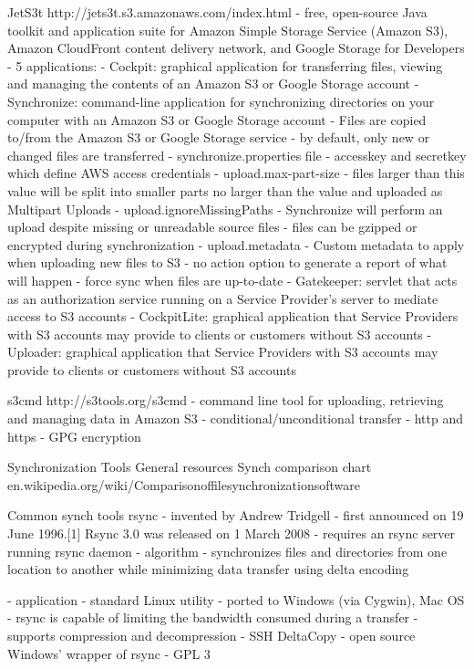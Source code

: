 			JetS3t
				http://jets3t.s3.amazonaws.com/index.html
				- free, open-source Java toolkit and application suite for Amazon Simple Storage Service (Amazon S3), Amazon CloudFront content delivery network, and Google Storage for Developers
				- 5 applications:
					- Cockpit: graphical application for transferring files, viewing and managing the contents of an Amazon S3 or Google Storage account
					- Synchronize: command-line application for synchronizing directories on your computer with an Amazon S3 or Google Storage account
						- Files are copied to/from the Amazon S3 or Google Storage service
						- by default, only new or changed files are transferred
						- synchronize.properties file
							- accesskey and secretkey which define AWS access credentials
							- upload.max-part-size
								- files larger than this value will be split into smaller parts no larger than the value and uploaded as Multipart Uploads
							- upload.ignoreMissingPaths
								- Synchronize will perform an upload despite missing or unreadable source files
							- files can be gzipped or encrypted during synchronization
							- upload.metadata
								-  Custom metadata to apply when uploading new files to S3
						- no action option to generate a report of what will happen
						- force sync when files are up-to-date
					- Gatekeeper: servlet that acts as an authorization service running on a Service Provider's server to mediate access to S3 accounts
					- CockpitLite: graphical application that Service Providers with S3 accounts may provide to clients or customers without S3 accounts
					- Uploader: graphical application that Service Providers with S3 accounts may provide to clients or customers without S3 accounts
					
		s3cmd
			http://s3tools.org/s3cmd
				- command line tool for uploading, retrieving and managing data in Amazon S3
				- conditional/unconditional transfer
				- http and https
				- GPG encryption
				
	Synchronization Tools
		General resources
			Synch comparison chart 
				en.wikipedia.org/wiki/Comparisonoffilesynchronizationsoftware
		
		Common synch tools
			rsync
				- invented by Andrew Tridgell
				- first announced on 19 June 1996.[1] Rsync 3.0 was released on 1 March 2008
				- requires an rsync server running rsync daemon
				- algorithm
					- synchronizes files and directories from one location to another while minimizing data transfer using delta encoding
					
				- application
					- standard Linux utility
					- ported to Windows (via Cygwin), Mac OS
					- rsync is capable of limiting the bandwidth consumed during a transfer
					- supports compression and decompression
					- SSH
			DeltaCopy
				- open source Windows' wrapper of rsync		
				- GPL 3
				
